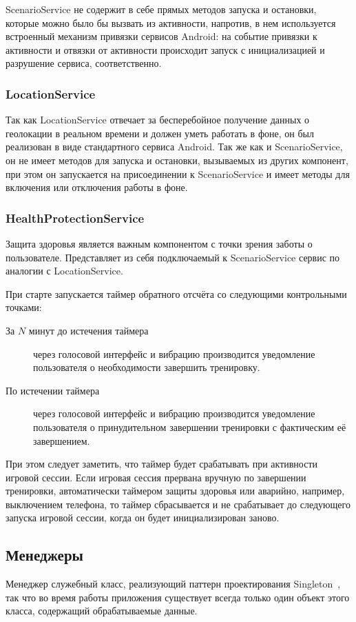 ScenarioService не содержит в себе прямых методов запуска и остановки, которые можно было бы вызвать из активности, напротив, в нем используется встроенный механизм привязки сервисов Android: на событие привязки к активности и отвязки от активности происходит запуск с инициализацией и разрушение сервиса, соответственно.
\subsubsection*{LocationService}
Так как LocationService отвечает за бесперебойное получение данных о геолокации в реальном времени и должен уметь работать в фоне, он был реализован в виде стандартного сервиса Android. Так же как и ScenarioService, он не имеет методов для запуска и остановки, вызываемых из других компонент, при этом он запускается на присоединении к ScenarioService и имеет методы для включения или отключения работы в фоне.

\subsubsection*{HealthProtectionService}
Защита здоровья является важным компонентом с точки зрения заботы о пользователе. Представляет из себя подключаемый к ScenarioService сервис по аналогии с LocationService. 

При старте запускается таймер обратного отсчёта со следующими контрольными точками:
\begin{description}
	\item[За $N$ минут до истечения таймера] через голосовой интерфейс и вибрацию производится уведомление пользователя о необходимости завершить тренировку.
	\item[По истечении таймера] через голосовой интерфейс и вибрацию производится уведомление пользователя о принудительном завершении тренировки с фактическим её завершением.
\end{description}
\smallskip
При этом следует заметить, что таймер будет срабатывать при активности игровой сессии. 
Если игровая сессия прервана вручную по завершении тренировки, автоматически таймером защиты здоровья или аварийно, например, выключением телефона, то таймер сбрасывается и не срабатывает до следующего запуска игровой сессии, когда он будет инициализирован заново.

\subsection*{Менеджеры}
Менеджер \textemdash\space служебный класс, реализующий паттерн проектирования Singleton~\autocite{singleton}, так что во время работы приложения существует всегда только один объект этого класса, содержащий обрабатываемые данные.

